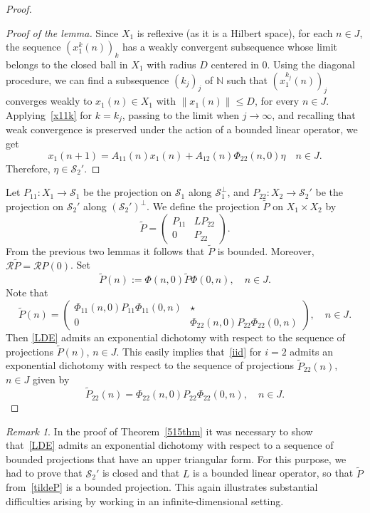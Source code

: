 \documentclass[11pt,reqno,a4paper]{amsart}
\theoremstyle{plain}
\numberwithin{equation}{section}
\theoremstyle{remark}
\newtheorem{remark}{Remark}
\begin{document}
\begin{proof}
\begin{proof}[Proof of the lemma]
Since $X_1$ is reflexive (as it is a Hilbert space), for each $n\in J$, the sequence $(x_1^k(n))_k$ has a weakly convergent subsequence whose limit belongs to the closed ball in $X_1$ with radius $D$ centered in $0$. Using the diagonal procedure, we can find a subsequence $(k_j)_j$ of $\mathbb N$ such that $(x_1^{k_j}(n))_j$ converges weakly to $x_1(n)\in X_1$ with $\|x_1(n)\| \le D$, for every $n\in J$.
Applying~\eqref{x11k} for $k=k_j$, passing to the limit when $j\to \infty$, and recalling that weak convergence is preserved under the action of a bounded linear operator, we get
\[
x_1(n+1)=A_{11}(n)x_1(n)+A_{12}(n)\Phi_{22}(n, 0)\eta \quad n\in J.
\]
Therefore, $\eta\in \mathcal S_2'$. 
\end{proof}
Let $P_{11} \colon X_1\to \mathcal S_1$ be the projection on $\mathcal S_1$ along $\mathcal S_1^\perp$, and $P_{22}\colon X_2 \to \mathcal S_2'$ be the projection on $\mathcal S_2'$ along $(\mathcal S_2')^\perp$. We define the projection $\tilde P$ on $X_1\times X_2$ by 
\begin{equation}\label{tildeP}
\tilde P=\begin{pmatrix}
P_{11} & LP_{22}\\
0 &P_{22}
\end{pmatrix}.
\end{equation}
From the previous two lemmas it follows that $\tilde P$ is bounded. Moreover, $\mathcal R\tilde P=\mathcal RP(0)$. Set
\[
\tilde P(n):= \Phi(n, 0)\tilde P\Phi(0, n), \quad n\in J.
\]
Note that 
\[
\tilde P(n)=\begin{pmatrix}
\Phi_{11}(n, 0)P_{11}\Phi_{11}(0, n) & \star\\
0 &\Phi_{22}(n, 0)P_{22}\Phi_{22}(0, n)
\end{pmatrix}, \quad n\in J.
\]
Then \eqref{LDE} admits an exponential dichotomy with respect to the sequence of projections $\tilde P(n)$, $n\in J$. This easily implies that~\eqref{iid} for $i=2$ admits an exponential dichotomy with respect to the sequence of projections $\tilde P_{22}(n)$, $n\in J$ given by 
\[
\tilde P_{22}(n)=\Phi_{22}(n, 0)P_{22}\Phi_{22}(0, n), \quad n\in J.\]
\end{proof}

\begin{remark}\label{Remark8}
In the proof of Theorem~\ref{515thm} it was necessary to show that~\eqref{LDE} admits an exponential dichotomy with respect to a sequence of bounded projections that have an upper triangular form. For this purpose, we had to prove that $\mathcal S_2'$ is closed and that $L$ is a bounded linear operator, so that $\tilde P$ from~\eqref{tildeP} is a bounded projection. This again illustrates substantial difficulties arising by working in an infinite-dimensional setting.
\end{remark}
\end{document}
